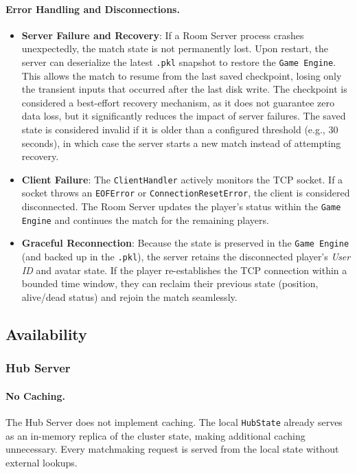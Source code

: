 \paragraph{Error Handling and Disconnections.}
\begin{itemize}
  \item \textbf{Server Failure and Recovery}: If a Room Server process crashes unexpectedly, the match state is not permanently lost. Upon restart, the server can deserialize the latest \texttt{.pkl} snapshot to restore the \texttt{Game Engine}. 
  This allows the match to resume from the last saved checkpoint, losing only the transient inputs that occurred after the last disk write. 
  The checkpoint is considered a best-effort recovery mechanism, as it does not guarantee zero data loss, but it significantly reduces the impact of server failures.
  The saved state is considered invalid if it is older than a configured threshold (e.g., 30 seconds), in which case the server starts a new match instead of attempting recovery.
  
  \item \textbf{Client Failure}: The \texttt{ClientHandler} actively monitors the TCP socket. 
  If a socket throws an \texttt{EOFError} or \texttt{ConnectionResetError}, the client is considered disconnected. The Room Server updates the player's status within the \texttt{Game Engine} and continues the match for the remaining players.
  
  \item \textbf{Graceful Reconnection}: Because the state is preserved in the \texttt{Game Engine} (and backed up in the \texttt{.pkl}), the server retains the disconnected player's \textit{User ID} and avatar state. 
  If the player re-establishes the TCP connection within a bounded time window, they can reclaim their previous state (position, alive/dead status) and rejoin the match seamlessly.
\end{itemize}

\subsection{Availability}\label{availability}

\subsubsection{Hub Server}

\paragraph{No Caching.}
The Hub Server does not implement caching.
The local \texttt{HubState} already serves as an in-memory replica of the cluster state, making additional caching unnecessary.
Every matchmaking request is served from the local state without external lookups.

